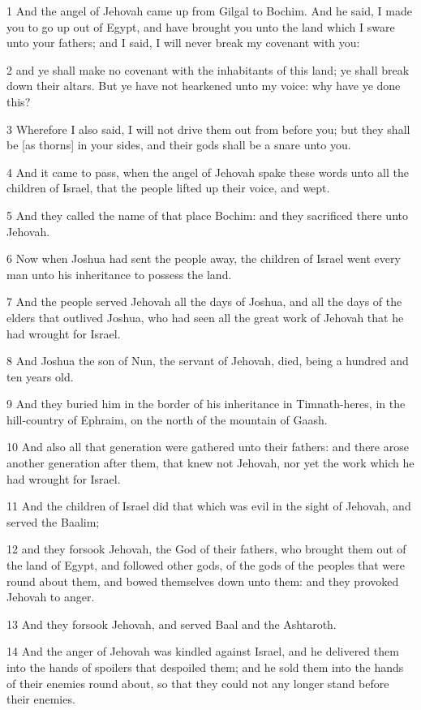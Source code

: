 \par 1 And the angel of Jehovah came up from Gilgal to Bochim. And he said, I made you to go up out of Egypt, and have brought you unto the land which I sware unto your fathers; and I said, I will never break my covenant with you:
\par 2 and ye shall make no covenant with the inhabitants of this land; ye shall break down their altars. But ye have not hearkened unto my voice: why have ye done this?
\par 3 Wherefore I also said, I will not drive them out from before you; but they shall be [as thorns] in your sides, and their gods shall be a snare unto you.
\par 4 And it came to pass, when the angel of Jehovah spake these words unto all the children of Israel, that the people lifted up their voice, and wept.
\par 5 And they called the name of that place Bochim: and they sacrificed there unto Jehovah.
\par 6 Now when Joshua had sent the people away, the children of Israel went every man unto his inheritance to possess the land.
\par 7 And the people served Jehovah all the days of Joshua, and all the days of the elders that outlived Joshua, who had seen all the great work of Jehovah that he had wrought for Israel.
\par 8 And Joshua the son of Nun, the servant of Jehovah, died, being a hundred and ten years old.
\par 9 And they buried him in the border of his inheritance in Timnath-heres, in the hill-country of Ephraim, on the north of the mountain of Gaash.
\par 10 And also all that generation were gathered unto their fathers: and there arose another generation after them, that knew not Jehovah, nor yet the work which he had wrought for Israel.
\par 11 And the children of Israel did that which was evil in the sight of Jehovah, and served the Baalim;
\par 12 and they forsook Jehovah, the God of their fathers, who brought them out of the land of Egypt, and followed other gods, of the gods of the peoples that were round about them, and bowed themselves down unto them: and they provoked Jehovah to anger.
\par 13 And they forsook Jehovah, and served Baal and the Ashtaroth.
\par 14 And the anger of Jehovah was kindled against Israel, and he delivered them into the hands of spoilers that despoiled them; and he sold them into the hands of their enemies round about, so that they could not any longer stand before their enemies.
